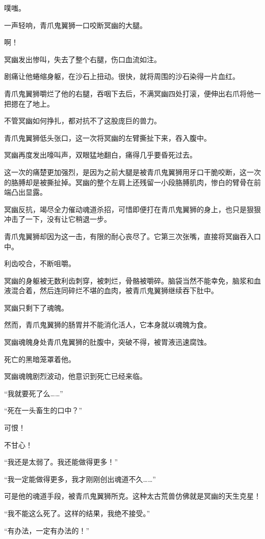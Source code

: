\begin{this_body}
噗嗤。

一声轻响，青爪鬼翼狮一口咬断冥幽的大腿。

啊！

冥幽发出惨叫，失去了整个右腿，伤口血流如注。

剧痛让他蜷缩身躯，在沙石上扭动。很快，就将周围的沙石染得一片血红。

青爪鬼翼狮嚼烂了他的右腿，吞咽下去后，不满冥幽四处打滚，便伸出右爪将他一把摁在了地上。

不管冥幽如何挣扎，都对抗不了这股庞巨的兽力。

青爪鬼翼狮低头张口，这一次将冥幽的左臂撕扯下来，吞入腹中。

冥幽再度发出嚎叫声，双眼猛地翻白，痛得几乎要昏死过去。

这一次的痛楚更加强烈，是因为之前大腿是被青爪鬼翼狮用牙口干脆咬断，这一次的胳膊却是被撕扯掉。冥幽的整个左肩上还残留一小段胳膊肌肉，惨白的臂骨在前端凸出显露。

冥幽反抗，竭尽全力催动魂道杀招，可惜即便打在青爪鬼翼狮的身上，也只是狠狠冲击了一下，没有让它稍退一步。

青爪鬼翼狮却因为这一击，有限的耐心丧尽了。它第三次张嘴，直接将冥幽吞入口中。

利齿咬合，不断咀嚼。

冥幽的身躯被无数利齿刺穿，被刺烂，骨骼被嚼碎。脑袋当然不能幸免，脑浆和血液混合着，然后连同碎烂不堪的血肉，被青爪鬼翼狮继续吞下肚中。

冥幽只剩下了魂魄。

然而，青爪鬼翼狮的肠胃并不能消化活人，它本身就以魂魄为食。

冥幽魂魄身处青爪鬼翼狮的肚腹中，突破不得，被胃液迅速腐蚀。

死亡的黑暗笼罩着他。

冥幽魂魄剧烈波动，他意识到死亡已经来临。

“我就要死了么……”

“死在一头畜生的口中？”

可恨！

不甘心！

“我还是太弱了。我还能做得更多！”

“我一定能做得更多，我才刚刚创出魂道不久……”

可是他的魂道手段，被青爪鬼翼狮所克。这种太古荒兽仿佛就是冥幽的天生克星！

“我不能这么死了。这样的结果，我绝不接受。”

“有办法，一定有办法的！”


\end{this_body}
